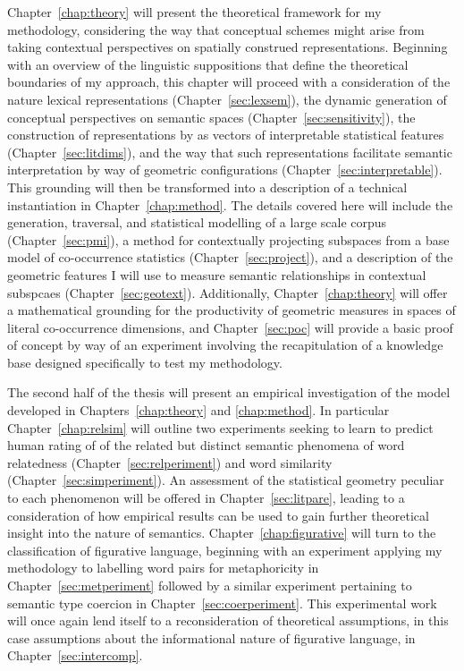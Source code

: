 Chapter~\ref{chap:theory} will present the theoretical framework for my methodology, considering the way that conceptual schemes might arise from taking contextual perspectives on spatially construed representations.  Beginning with an overview of the linguistic suppositions that define the theoretical boundaries of my approach, this chapter will proceed with a consideration of the nature lexical representations (Chapter~\ref{sec:lexsem}), the dynamic generation of conceptual perspectives on semantic spaces (Chapter~\ref{sec:sensitivity}), the construction of representations by as vectors of interpretable statistical features (Chapter~\ref{sec:litdims}), and the way that such representations facilitate semantic interpretation by way of geometric configurations (Chapter~\ref{sec:interpretable}).  This grounding will then be transformed into a description of a technical instantiation in Chapter~\ref{chap:method}.  The details covered here will include the generation, traversal, and statistical modelling of a large scale corpus (Chapter~\ref{sec:pmi}), a method for contextually projecting subspaces from a base model of co-occurrence statistics (Chapter~\ref{sec:project}), and a description of the geometric features I will use to measure semantic relationships in contextual subspcaes (Chapter~\ref{sec:geotext}).  Additionally, Chapter~\ref{chap:theory} will offer a mathematical grounding for the productivity of geometric measures in spaces of literal co-occurrence dimensions, and Chapter~\ref{sec:poc} will provide a basic proof of concept by way of an experiment involving the recapitulation of a knowledge base designed specifically to test my methodology.

The second half of the thesis will present an empirical investigation of the model developed in Chapters~\ref{chap:theory} and \ref{chap:method}.  In particular Chapter~\ref{chap:relsim} will outline two experiments seeking to learn to predict human rating of of the related but distinct semantic phenomena of word relatedness (Chapter~\ref{sec:relperiment}) and word similarity (Chapter~\ref{sec:simperiment}).  An assessment of the statistical geometry peculiar to each phenomenon will be offered in Chapter~\ref{sec:litpare}, leading to a consideration of how empirical results can be used to gain further theoretical insight into the nature of semantics.  Chapter~\ref{chap:figurative} will turn to the classification of figurative language, beginning with an experiment applying my methodology to labelling word pairs for metaphoricity in Chapter~\ref{sec:metperiment} followed by a similar experiment pertaining to semantic type coercion in Chapter~\ref{sec:coerperiment}.  This experimental work will once again lend itself to a reconsideration of theoretical assumptions, in this case assumptions about the informational nature of figurative language, in Chapter~\ref{sec:intercomp}.

